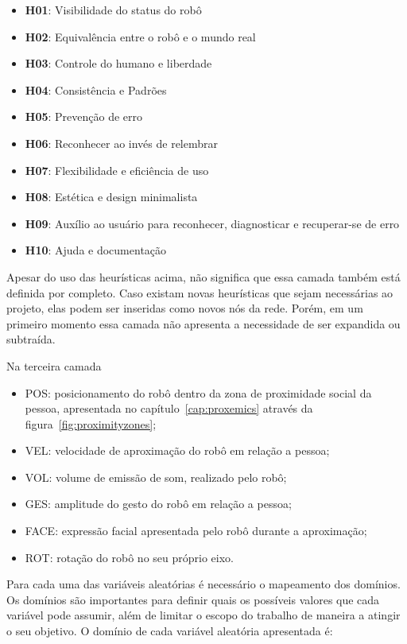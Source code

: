 \begin{itemize}
	\item \textbf{H01}: Visibilidade do status do robô
	\item \textbf{H02}: Equivalência entre o robô e o mundo real
	\item \textbf{H03}: Controle do humano e liberdade
	\item \textbf{H04}: Consistência e Padrões
	\item \textbf{H05}: Prevenção de erro
	\item \textbf{H06}: Reconhecer ao invés de relembrar
	\item \textbf{H07}: Flexibilidade e eficiência de uso
	\item \textbf{H08}: Estética e design minimalista
	\item \textbf{H09}: Auxílio ao usuário para reconhecer, diagnosticar e recuperar-se de erro
	\item \textbf{H10}: Ajuda e documentação
\end{itemize}

Apesar do uso das heurísticas acima, não significa que essa camada também está definida por completo. Caso existam novas heurísticas que sejam necessárias ao projeto, elas podem ser inseridas como novos nós da rede. Porém, em um primeiro momento essa camada não apresenta a necessidade de ser expandida ou subtraída.

Na terceira camada

\begin{itemize}
	\item POS: posicionamento do robô dentro da zona de proximidade social da pessoa, apresentada no capítulo~\ref{cap:proxemics} através da figura~\ref{fig:proximityzones};
	\item VEL: velocidade de aproximação do robô em relação a pessoa;
	\item VOL: volume de emissão de som, realizado pelo robô;
	\item GES: amplitude do gesto do robô em relação a pessoa;
	\item FACE: expressão facial apresentada pelo robô durante a aproximação;
	\item ROT: rotação do robô no seu próprio eixo.
\end{itemize}

Para cada uma das variáveis aleatórias é necessário o mapeamento dos domínios. Os domínios são importantes para definir quais os possíveis valores que cada variável pode assumir, além de limitar o escopo do trabalho de maneira a atingir o seu objetivo. O domínio de cada variável aleatória apresentada é:

